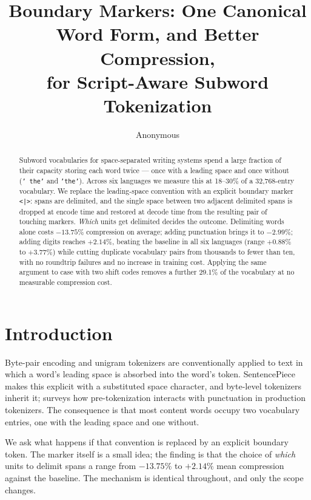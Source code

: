 \documentclass[11pt]{article}
\title{Boundary Markers: One Canonical Word Form, and Better Compression,\\
       for Script-Aware Subword Tokenization}
\author{Anonymous}
\newcommand{\mk}{\texttt{<|>}}
\begin{document}
\maketitle

\begin{abstract}
Subword vocabularies for space-separated writing systems spend a large fraction of their
capacity storing each word twice --- once with a leading space and once without
(\texttt{' the'} and \texttt{'the'}). Across six languages we measure this at 18--30\% of a
32{,}768-entry vocabulary. We replace the leading-space convention with an explicit
boundary marker \mk{}: spans are delimited, and the single space between two adjacent
delimited spans is dropped at encode time and restored at decode time from the resulting
pair of touching markers. \emph{Which} units get delimited decides the outcome. Delimiting
words alone costs $-13.75\%$ compression on average; adding punctuation brings it to
$-2.99\%$; adding digits reaches $+2.14\%$, beating the baseline in all six languages
(range $+0.88\%$ to $+3.77\%$) while cutting duplicate vocabulary pairs from thousands to
fewer than ten, with no roundtrip failures and no increase in training cost. Applying the
same argument to case with two shift codes removes a further 29.1\% of the vocabulary at no
measurable compression cost.
\end{abstract}

\section{Introduction}
\label{sec:intro}

Byte-pair encoding \citep{sennrich-etal-2016-neural} and unigram tokenizers
\citep{kudo-2018-subword,land2025piecesdoesunigramtokenization} are conventionally applied
to text in which a word's leading space is absorbed into the word's token. SentencePiece
\citep{kudo-richardson-2018-sentencepiece} makes this explicit with a substituted space
character, and byte-level tokenizers inherit it; \citet{tokencontributions-gpt4} surveys how
pre-tokenization interacts with punctuation in production tokenizers. The consequence is
that most content words occupy two vocabulary entries, one with the leading space and one
without.

We ask what happens if that convention is replaced by an explicit boundary token. The marker
itself is a small idea; the finding is that the choice of \emph{which} units to delimit
spans a range from $-13.75\%$ to $+2.14\%$ mean compression against the baseline. The
mechanism is identical throughout, and only the scope changes.
\end{document}
